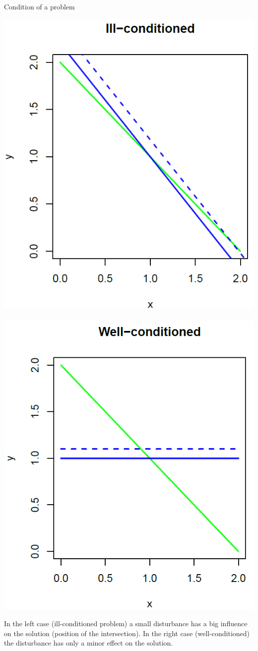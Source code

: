 \documentclass[11pt,compress,t,notes=noshow, xcolor=table]{beamer}
\begin{document}
\begin{vbframe}{Condition of a problem}
\begin{center}
\includegraphics[width = 0.4\linewidth]{figure_man/ill-con.png} ~~~ \includegraphics[width = 0.4\linewidth]{figure_man/well-con.png}

\end{center}

\vspace{0.2cm}

\begin{footnotesize}
In the left case (ill-conditioned problem) a small disturbance has a big influence on the solution (position of the intersection).
In the right case (well-conditioned) the disturbance has only a minor effect on the solution.
\end{footnotesize}

\end{vbframe}
\end{document}

